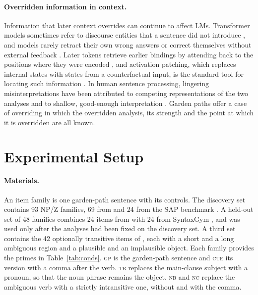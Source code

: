 \documentclass[11pt]{article}
\newcommand{\cond}[1]{\textsc{#1}}
\begin{document}
\paragraph{Overridden information in context.}
Information that later context overrides can continue to affect LMs.
Transformer models sometimes refer to discourse entities that a sentence did not introduce \citep{schuster2022}, and models rarely retract their own wrong answers \citep{yang2025retraction} or correct themselves without external feedback \citep{kamoi2024}.
Later tokens retrieve earlier bindings by attending back to the positions where they were encoded \citep{prakash2026}, and activation patching, which replaces internal states with states from a counterfactual input, is the standard tool for locating such information \citep{vig2020causal,meng2022locating,zhang2024patching}.
In human sentence processing, lingering misinterpretations have been attributed to competing representations of the two analyses \citep{slattery2013} and to shallow, good-enough interpretation \citep{ferreira2003}.
Garden paths offer a case of overriding in which the overridden analysis, its strength and the point at which it is overridden are all known.

\section{Experimental Setup}
\label{sec:setup}

\paragraph{Materials.}
An item family is one garden-path sentence with its controls.
The discovery set contains 93 NP/Z families, 69 from \citet{amouyal2025} and 24 from the SAP benchmark \citep{huang2024}.
A held-out set of 48 families combines 24 items from \citet{cehakova2025} with 24 from SyntaxGym \citep{gauthier2020}, and was used only after the analyses had been fixed on the discovery set.
A third set contains the 42 optionally transitive items of \citet{christianson2001}, each with a short and a long ambiguous region and a plausible and an implausible object.
Each family provides the primes in Table~\ref{tab:conds}.
\cond{gp} is the garden-path sentence and \cond{cue} its version with a comma after the verb.
\cond{tb} replaces the main-clause subject with a pronoun, so that the noun phrase remains the object.
\cond{nb} and \cond{nc} replace the ambiguous verb with a strictly intransitive one, without and with the comma.
\end{document}
